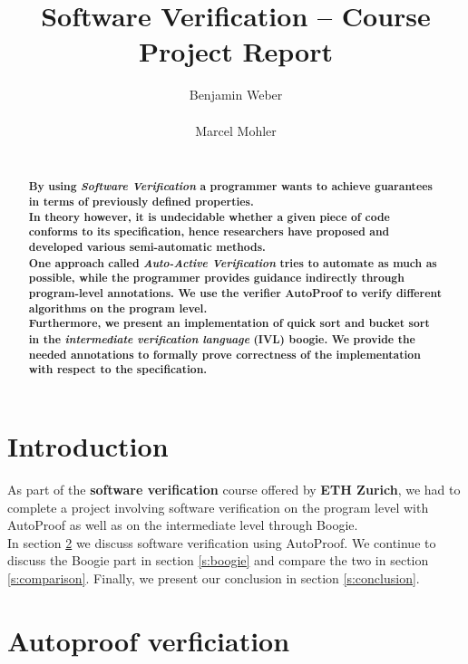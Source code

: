 \documentclass{report}
\title{Software Verification -- Course Project Report}
\author{
%
%
\alignauthor Benjamin Weber\\
	\affaddr{ETH ID 11-933-017}\\
	\email{benweber@student.ethz.ch}
\alignauthor Marcel Mohler\\
	\affaddr{ETH ID 09-922-998}\\
	\email{mohlerm@student.ethz.ch}
}
\begin{document}
\maketitle

\begin{abstract}
\textbf{By using \textit{Software Verification} a programmer wants to achieve guarantees in terms of previously defined properties.\\
In theory however, it is undecidable whether a given piece of code conforms to its specification, hence researchers have proposed and developed various semi-automatic methods.\\
One approach called \textit{Auto-Active Verification} tries to automate as much as possible, while the programmer provides guidance indirectly through program-level annotations\cite{autoactivelecture}.
We use the verifier AutoProof\cite{autoproof} to verify different algorithms on the program level. \\Furthermore, we present an implementation of quick sort\cite{quicksort} and bucket sort\cite{bucketsort} in the \textit{intermediate verification language} (IVL) boogie\cite{boogie}. We provide the needed annotations to formally prove correctness of the implementation with respect to the specification.
}
\end{abstract}

\section{Introduction}
\label{s:introduction}
As part of the \textbf{software verification} course offered by \textbf{ETH Zurich},
we had to complete a project involving software verification on the program
level with AutoProof as well as on the intermediate level through Boogie.\\
In section \ref{s:autoproof} we discuss software verification using AutoProof.
We continue to discuss the Boogie part in section \ref{s:boogie} and compare
the two in section \ref{s:comparison}. Finally, we present our conclusion in
section \ref{s:conclusion}.

\section{Autoproof verficiation}
\label{s:autoproof}
\end{document}
